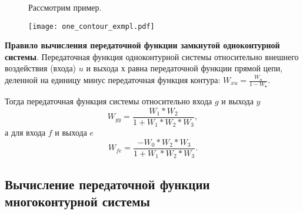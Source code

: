 \documentclass[../../TAU.tex]{subfiles}
\begin{document}
    \begin{figure}[h]
        \begin{minipage}[h]{0.29\linewidth}
            Рассмотрим пример.
            \vspace{3cm}
        \end{minipage}
        \begin{minipage}[h]{0.70\linewidth}
            \texttt{[image: one\_contour\_exmpl.pdf]}
        \end{minipage}
    \end{figure}

    {\bf Правило вычисления передаточной функции замкнутой одноконтурной системы}. 
    Передаточная функция одноконтурной системы относительно внешнего воздействия (входа) $u$ и выхода $х$ равна передаточной функции прямой цепи, деленной на единицу минус передаточная функция контура: $W_{xu}=\frac{W_\text{п}}{1-W_\text{к}}$.

    Тогда передаточная функция системы относительно входа $g$ и выхода $y$ 
    $$W_{gy}=\frac{W_1*W_2}{1+W_1*W_2*W_3},$$
    а для входа $f$ и выхода $e$ 
    $$W_{fe}=\frac{-W_0*W_2*W_3}{1+W_1*W_2*W_3}.$$

\subsection{Вычисление передаточной функции многоконтурной системы}
\end{document}
